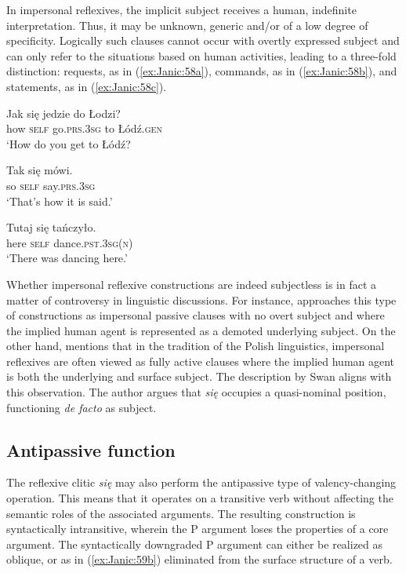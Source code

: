 \documentclass[output=paper]{langscibook}
\begin{document}
In impersonal reflexives, the implicit subject receives a human, indefinite interpretation. Thus, it may be unknown, generic and/or of a low degree of specificity. Logically such clauses cannot occur with overtly expressed subject and can only refer to the situations based on human activities, leading to a three-fold distinction: requests, as in (\ref{ex:Janic:58a}), commands, as in (\ref{ex:Janic:58b}), and statements, as in (\ref{ex:Janic:58c}).

\ea \label{ex:Janic:58}
\ea \label{ex:Janic:58a}

\gll Jak	się 	 jedzie		 do	Łodzi?\\
		how	\textsc{self}	go.\textsc{prs.3sg}		to	Łódź.\textsc{gen} \\
\glt ‘How do you get to Łódź? 	\citep[583]{Swan2002}

\ex \label{ex:Janic:58b}
\gll Tak	 się	 mówi.\\
		so		\textsc{self}	say.\textsc{prs.3sg}\\			
\glt ‘That’s how it is said.’	\citep[60]{Bielec1998}
	
\ex \label{ex:Janic:58c}
\gll Tutaj	się	 tańczyło.\\
	 here	\textsc{self}	dance.\textsc{pst.3sg(n)}\\
\glt ‘There was dancing here.’ 
\z 
\z 
	
Whether impersonal reflexive constructions are indeed subjectless is in fact a matter of controversy in linguistic discussions. For instance, \citet{Comrie1985} approaches this type of constructions as impersonal passive clauses with no overt subject and where the implied human agent is represented as a demoted underlying subject. On the other hand, \citep{Siewierska1988} mentions that in the tradition of the Polish linguistics, impersonal reflexives are often viewed as fully active clauses where the implied human agent is both the underlying and surface subject. The description by Swan \citep[538]{Swan2003} aligns with this observation. The author argues that \textit{się} occupies a quasi-nominal position, functioning \textit{de facto} as subject.



\subsection{Antipassive function} \label{sec:Janic:4.3}

The reflexive clitic \textit{się} may also perform the antipassive type of valency-changing operation. This means that it operates on a transitive verb without affecting the semantic roles of the associated arguments. The resulting construction is syntactically intransitive, wherein the P argument loses the properties of a core argument. The syntactically downgraded P argument can either be realized as oblique, or as in (\ref{ex:Janic:59b}) eliminated from the surface structure of a verb.
\end{document}
